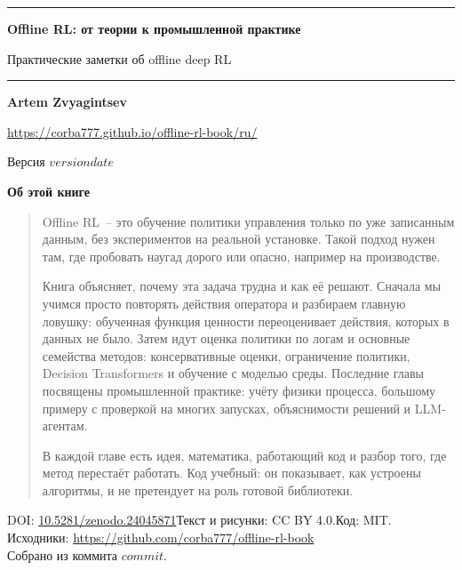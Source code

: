 \begin{titlepage}
\thispagestyle{empty}
\vspace*{3.5cm}
\noindent\rule{\textwidth}{2pt}
\begin{center}
  {\LARGE\bfseries Offline RL: от теории к промышленной практике\par}
  \vspace{0.6em}
  {\large Практические заметки об offline deep RL\par}
\end{center}
\noindent\rule{\textwidth}{0.6pt}

\vspace{1.6cm}
\begin{center}
  {\large\bfseries Artem Zvyagintsev\par}
  \vspace{0.3em}
  {\normalsize\url{https://corba777.github.io/offline-rl-book/ru/}\par}
  \vspace{1.2em}
  {\normalsize Версия $version$\quad\textperiodcentered\quad $date$\par}
\end{center}

\vspace{1.6cm}
\begin{center}\textbf{Об этой книге}\end{center}
\begin{quote}
Offline RL~-- это обучение политики управления только по уже записанным
данным, без экспериментов на реальной установке. Такой подход нужен там, где
пробовать наугад дорого или опасно, например на производстве.

Книга объясняет, почему эта задача трудна и как её решают. Сначала мы учимся
просто повторять действия оператора и разбираем главную ловушку: обученная
функция ценности переоценивает действия, которых в данных не было. Затем идут
оценка политики по логам и основные семейства методов: консервативные оценки, ограничение политики, Decision Transformers и
обучение с моделью среды. Последние главы посвящены промышленной практике:
учёту физики процесса, большому примеру с проверкой на многих запусках,
объяснимости решений и LLM-агентам.

В каждой главе есть идея, математика, работающий код и разбор того, где метод
перестаёт работать. Код учебный: он показывает, как устроены алгоритмы, и не
претендует на роль готовой библиотеки.
\end{quote}

\vfill
\begin{center}\footnotesize
DOI: \href{https://doi.org/10.5281/zenodo.24045871}{10.5281/zenodo.24045871}\quad Текст и рисунки: CC BY 4.0.\quad Код: MIT.\\
Исходники: \url{https://github.com/corba777/offline-rl-book}\\
Собрано из коммита $commit$.
\end{center}
\end{titlepage}
\setcounter{page}{2}   %
